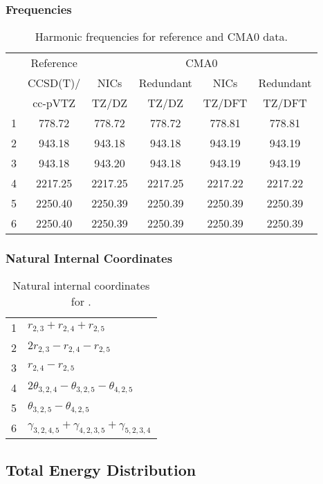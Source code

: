 \documentclass[10pt,oneside]{article}
\begin{document}
\begin{table}[h!]
\subsubsection*{Frequencies}
\centering
\caption{Harmonic frequencies for reference and CMA0 data.}
\begin{tabular}{cccccc}
\toprule
{} & Reference & \multicolumn{4}{c}{CMA0} \\
{} &  CCSD(T)/ &    NICs &  Redundant &    NICs & Redundant \\
{} &   cc-pVTZ &   TZ/DZ &      TZ/DZ &  TZ/DFT &    TZ/DFT \\
\midrule
1 &    778.72 &  778.72 &     778.72 &  778.81 &    778.81 \\
2 &    943.18 &  943.18 &     943.18 &  943.19 &    943.19 \\
3 &    943.18 &  943.20 &     943.18 &  943.19 &    943.19 \\
4 &   2217.25 & 2217.25 &    2217.25 & 2217.22 &   2217.22 \\
5 &   2250.40 & 2250.39 &    2250.39 & 2250.39 &   2250.39 \\
6 &   2250.40 & 2250.39 &    2250.39 & 2250.39 &   2250.39 \\
\bottomrule
\end{tabular}
\end{table}

\begin{table}[h!]
\subsubsection*{Natural Internal Coordinates}
\centering
\caption{Natural internal coordinates for .}
\small
\begin{tabular}{ll}
\toprule
  1   & $r_{2,3} + r_{2,4} + r_{2,5}$ \\
  2   & $2r_{2,3} - r_{2,4} - r_{2,5}$ \\
  3   & $r_{2,4} - r_{2,5}$ \\
  4   & $2\theta_{3,2,4} - \theta_{3,2,5} - \theta_{4,2,5}$ \\
  5   & $\theta_{3,2,5} - \theta_{4,2,5}$ \\
  6   & $\gamma_{3,2,4,5} + \gamma_{4,2,3,5} + \gamma_{5,2,3,4}$ \\
\bottomrule
\end{tabular}
\end{table}

\begin{table}
\subsection*{Total Energy Distribution}
\centering\end{table}
\end{document}
